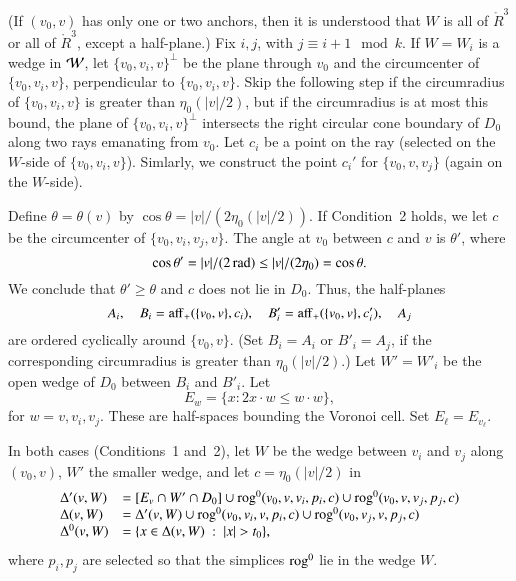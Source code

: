 (If $(v_0,v)$ has only one or two anchors, then it is understood
 that $W$ is all of $\ring{R}^3$ or all of $\ring{R}^3$, except a half-plane.)
Fix $i,j$, with $j\equiv i+1\mod k$. If $W = W_i$ is a wedge in
${\mathcal W}$, let $\{v_0,v_i,v\}^\perp$ be the plane through $v_0$ and
the circumcenter of $\{v_0,v_i,v\}$, perpendicular to $\{v_0,v_i,v\}$.
Skip the following step if the circumradius of $\{v_0,v_i,v\}$ is
greater than $\eta_0(|v|/2)$, but if the circumradius is at most
this bound, the plane
of $\{v_0,v_i,v\}^\perp$
intersects the right circular cone boundary of $D_0$ along two rays
emanating from $v_0$.  Let $c_i$ be a point on the ray (selected on
the $W$-side of $\{v_0,v_i,v\}$).  Simlarly, we construct the point
$c_i'$ for $\{v_0,v,v_j\}$ (again on the $W$-side).

Define $\theta=\theta(v)$ by $\cos\theta = |v|/(2\eta_0(|v|/2))$.
If Condition~2 holds, we let $c$ be the 
circumcenter of $\{v_0,v_i,v_j,v\}$.  The angle
at $v_0$ between $c$ and $v$ is
$\theta'$, where
$$\cos\theta' = |v|/(2\operatorname{rad})\le |v|/(2\eta_0) = \cos\theta.$$
We conclude that $\theta'\ge\theta$ and $c$ does not lie in $D_0$.
Thus, the half-planes
   $$
   A_i,\quad B_i={\operatorname{aff}}_+(\{v_0,v\},c_i),\quad 
   B'_i = {\operatorname{aff}}_+(\{v_0,v\},c'_i), \quad
   A_j
   $$
are ordered cyclically around $\{v_0,v\}$. (Set $B_i=A_i$
or $B'_i=A_j$, if the corresponding circumradius is greater than
$\eta_0(|v|/2)$.)
Let $W'=W'_i$ be the open wedge of $D_0$ between $B_i$ and $B'_i$.
Let
    $$E_w = \{x : 2 x\cdot w \le w\cdot w\},$$
for $w = v,v_i,v_j$. These are half-spaces bounding the Voronoi
cell. Set $E_\ell = E_{v_\ell}$.

\begin{definition} \label{def:delta-e}
In both cases (Conditions~1 and~2), let $W$ be the wedge between
$v_i$ and $v_j$ along $(v_0,v)$, $W'$ the smaller wedge, 
and let $c=\eta_0(|v|/2)$ in
    $$
    \begin{array}{lll}
      \BigD'(v,W) &= [E_v\cap W'\cap D_0]\cup \op{rog}^0(v_0,v,v_i,p_i,c)
      \cup \op{rog}^0(v_0,v,v_j,p_j,c)
      \\
    \BigD(v,W) &= \BigD'(v,W) \cup 
    \op{rog}^0(v_0,v_i,v,p_i,c)
    \cup \op{rog}^0(v_0,v_j,v,p_j,c)\\
    \bigd(v,W) &= \{x\in\BigD(v,W)\mid |x|>t_0\},
    \end{array}
    $$
where $p_i,p_j$ are selected so that the simplices ${\operatorname{rog}}^0$ lie
in the wedge $W$.
\end{definition}

